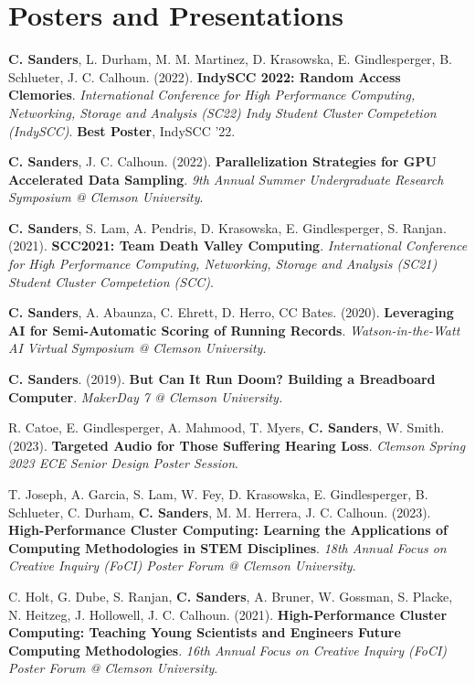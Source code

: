 \section{\textbf{Posters and Presentations}}
\vspace{-0.4mm}
\small{
\resumeSubHeadingListStart

\item \textbf{C. Sanders}, L. Durham, M. M. Martinez, D. Krasowska, E. Gindlesperger, B. Schlueter, J. C. Calhoun. (2022). \textbf{IndySCC 2022: Random Access Clemories}. \emph{International Conference for High Performance Computing, Networking, Storage and Analysis (SC22) Indy Student Cluster Competetion (IndySCC)}. \textbf{Best Poster}, IndySCC '22.

\item \textbf{C. Sanders}, J. C. Calhoun. (2022). \textbf{Parallelization Strategies for GPU Accelerated Data Sampling}. \emph{9th Annual Summer Undergraduate Research Symposium @ Clemson University}.

\item \textbf{C. Sanders}, S. Lam, A. Pendris, D. Krasowska, E. Gindlesperger, S. Ranjan. (2021). \textbf{SCC2021: Team Death Valley Computing}. \emph{International Conference for High Performance Computing, Networking, Storage and Analysis (SC21) Student Cluster Competetion (SCC)}.


\item \textbf{C. Sanders}, A. Abaunza, C. Ehrett, D. Herro, CC Bates. (2020). \textbf{Leveraging AI for Semi-Automatic Scoring of Running Records}. \emph{Watson-in-the-Watt AI Virtual Symposium @ Clemson University}.

\item \textbf{C. Sanders}. (2019). \textbf{But Can It Run Doom? Building a Breadboard Computer}. \emph{MakerDay 7 @ Clemson University.}

\item R. Catoe, E. Gindlesperger, A. Mahmood, T. Myers, \textbf{C. Sanders}, W. Smith. (2023). \textbf{Targeted Audio for Those Suffering Hearing Loss}. \emph{Clemson Spring 2023 ECE Senior Design Poster Session}.

\item T. Joseph, A. Garcia, S. Lam, W. Fey, D. Krasowska, E. Gindlesperger, B. Schlueter, C. Durham, \textbf{C. Sanders}, M. M. Herrera, J. C. Calhoun. (2023). \textbf{High-Performance Cluster Computing: Learning the Applications of Computing Methodologies in STEM Disciplines}. \emph{18th Annual Focus on Creative Inquiry (FoCI) Poster Forum @ Clemson University}.

\item C. Holt, G. Dube, S. Ranjan, \textbf{C. Sanders}, A. Bruner, W. Gossman, S. Placke, N. Heitzeg, J. Hollowell, J. C. Calhoun. (2021). \textbf{High-Performance Cluster Computing: Teaching Young Scientists and Engineers Future Computing Methodologies}. \emph{16th Annual Focus on Creative Inquiry (FoCI) Poster Forum @ Clemson University}.

\resumeSubHeadingListEnd
}
\vspace{-6mm}

